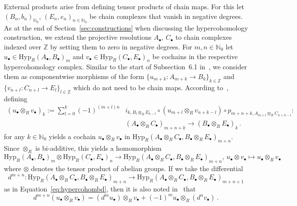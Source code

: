 \documentclass[12pt, a4paper]{article}
\numberwithin{equation}{section}
\theoremstyle{empty}
\theoremstyle{nonumberplain}
\begin{document}
External products arise from defining tensor products of chain maps. For this let $(B_n, b_n)_{\mathbb{N}_0}$, $(E_n, e_n)_{n \in \mathbb{N}_0}$ be chain complexes that vanish in negative degrees. As at the end of Section~\ref{sec:constructions} when discussing the hypercohomology construction, we extend the projective resolutions $A_{\bullet}$, $C_{\bullet}$ to chain complexes indexed over $\mathbb{Z}$ by setting them to zero in negative degrees. For $m, n \in \mathbb{N}_0$ let $u_{\bullet} \in \mathrm{Hyp}_R(A_{\bullet}, B_{\bullet})_m$ and $v_{\bullet} \in \mathrm{Hyp}_R(C_{\bullet}, E_{\bullet})_n$ be cochains in the respective hypercohomology complex. Similar to the start of Subsection~6.1 in~\cite{ghe24}, we consider them as componentwise morphisms of the form $\lbrace u_{m+k}: A_{m+k} \rightarrow B_k \rbrace_{k \in \mathbb{Z}}$ and $\lbrace v_{n+l}: C_{n+l} \rightarrow E_l \rbrace_{l \in \mathbb{Z}}$ which do not need to be chain maps. According to~\cite[p.~10]{bro82}, defining
\begin{align}
(u_{\bullet} \otimes_R v_{\bullet})_k := \sum_{l = 0}^k (-1)^{(m+l)n} &i_{k, B_l \otimes_R E_{k-l}} \circ (u_{m+l} \otimes_R v_{n+k-l}) \circ p_{m+n+k, A_{m+l} \otimes_R C_{n+k-l}}: \nonumber \\
&(A_{\bullet} \otimes_R C_{\bullet})_{m+n+k} \rightarrow (B_{\bullet} \otimes_R E_{\bullet})_k \, . \label{eq:chaintensorprod}
\end{align}
for any $k \in \mathbb{N}_0$ yields a cochain $u_{\bullet} \otimes_R v_{\bullet}$ in $\mathrm{Hyp}_R(A_{\bullet} \otimes_R C_{\bullet}, B_{\bullet} \otimes_R E_{\bullet})_{m+n}$. Since $\otimes_R$ is bi-additive, this yields a homomorphism
\[ \mathrm{Hyp}_R(A_{\bullet}, B_{\bullet})_m \otimes \mathrm{Hyp}_R(C_{\bullet}, E_{\bullet})_n  \rightarrow \mathrm{Hyp}_R(A_{\bullet} \otimes_R C_{\bullet}, B_{\bullet} \otimes_R E_{\bullet})_{m+n}, \, u_{\bullet} \otimes v_{\bullet} \mapsto u_{\bullet} \otimes_R v_{\bullet} \]
where $\otimes$ denotes the tensor product of abelian groups. If we take the differential
\[ d^{m+n}: \mathrm{Hyp}_R(A_{\bullet} \otimes_R C_{\bullet}, B_{\bullet} \otimes_R E_{\bullet})_{m+n} \rightarrow \mathrm{Hyp}_R(A_{\bullet} \otimes_R C_{\bullet}, B_{\bullet} \otimes_R E_{\bullet})_{m+n+1} \]
as in Equation~\ref{eq:hypercohombd}, then it is also noted in~\cite[p.~10]{bro82} that
\begin{equation}\label{eq:wellbehaveddiffs}
d^{m+n}(u_{\bullet} \otimes_R v_{\bullet}) = (d^m u_{\bullet}) \otimes_R v_{\bullet} + (-1)^m u_{\bullet} \otimes_R (d^n v_{\bullet}) \, .
\end{equation}
\end{document}
